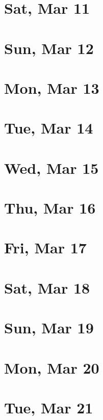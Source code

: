 	\section{Sat, Mar 11}
		
	\section{Sun, Mar 12}
		
	\section{Mon, Mar 13}
		
	\section{Tue, Mar 14}
		
	\section{Wed, Mar 15}
		
	\section{Thu, Mar 16}
		
	\section{Fri, Mar 17}
		
	\section{Sat, Mar 18}
		
	\section{Sun, Mar 19}
		
	\section{Mon, Mar 20}
		
	\section{Tue, Mar 21}
		

